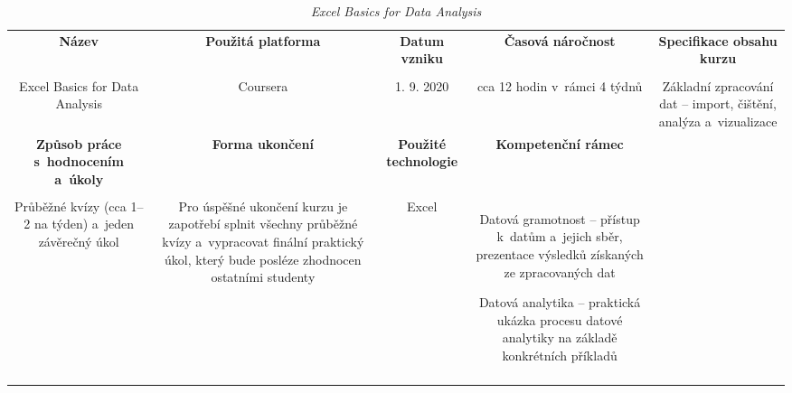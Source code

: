 \begin{landscape}

\begin{table}[htbp]

\renewcommand\thetable{8}

\caption{\textit{Excel Basics for Data Analysis}}\label{tab7}

\footnotesize

{

\justifying

\begin{tabularx}{\linewidth}{CCCCC}

\toprule

\textbf{Název} &

\textbf{Použitá platforma} &

\textbf{Datum vzniku} &

\textbf{Časová náročnost} &
 
\textbf{Specifikace obsahu kurzu}

\\

\tabularnewline
\midrule

Excel Basics for Data Analysis

&

Coursera

&

1. 9. 2020

&

cca 12 hodin v~rámci 4 týdnů

&

Základní zpracování dat – import, čištění, analýza a~vizualizace

\\
\toprule

\textbf{Způsob práce s~hodnocením a~úkoly} &

\textbf{Forma ukončení} &

\textbf{Použité technologie} &

\textbf{Kompetenční rámec} 

\\

\tabularnewline
\midrule

Průběžné kvízy (cca 1–2 na týden) a~jeden závěrečný úkol    

&

Pro úspěšné ukončení kurzu je zapotřebí splnit všechny průběžné kvízy a~vypracovat finální praktický úkol, který bude posléze zhodnocen ostatními studenty

&

Excel

&

Datová gramotnost – přístup k~datům a~jejich sběr, prezentace výsledků získaných ze zpracovaných dat

Datová analytika – praktická ukázka procesu datové analytiky na základě konkrétních příkladů   

\\

\tabularnewline
\bottomrule
\end{tabularx}

}

\end{table}

\end{landscape}